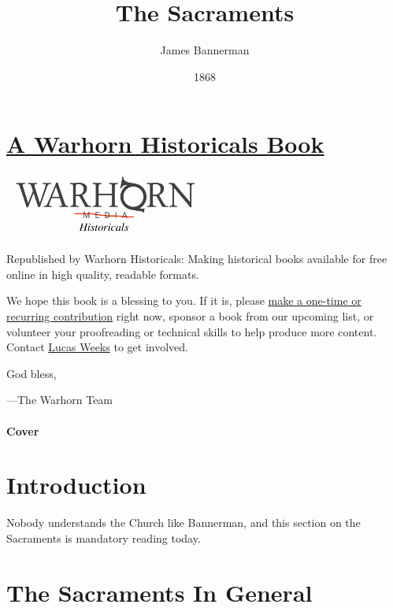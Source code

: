 \documentclass[]{book}
\title{The Sacraments}
\author{James Bannerman}
\date{1868}
\begin{document}
\maketitle

{
\setcounter{tocdepth}{1}
\tableofcontents
}
\hypertarget{a-warhorn-historicals-book}{%
\chapter*{\texorpdfstring{\href{https://historicals.warhornmedia.com/}{A Warhorn Historicals Book}}{A Warhorn Historicals Book}}\label{a-warhorn-historicals-book}}

\includegraphics[width=0.5\textwidth,height=\textheight]{images/warhornlogo.png}

Republished by Warhorn Historicals:
Making historical books available for free online in high quality, readable formats.

We hope this book is a blessing to you. If it is, please \href{https://warhornmedia.com/give}{make a one-time or recurring contribution} right now, sponsor a book from our upcoming list, or volunteer your proofreading or technical skills to help produce more content. Contact \href{mailto:lucas@beggarsborn.com}{Lucas Weeks} to get involved.

God bless,

---The Warhorn Team

\hypertarget{cover}{%
\subsubsection*{Cover}\label{cover}}

\hypertarget{introduction}{%
\chapter*{Introduction}\label{introduction}}

Nobody understands the Church like Bannerman, and this section on the Sacraments is mandatory reading today.

\hypertarget{the-sacraments-in-general}{%
\chapter{The Sacraments In General}\label{the-sacraments-in-general}}
\end{document}
